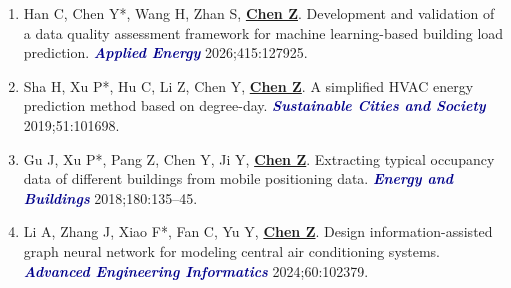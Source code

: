 \documentclass[11pt,a4paper]{article}
\newcommand{\me}[1]{\underline{\textbf{#1}}}
\newcommand{\journal}[1]{\textcolor{darkblue}{\textbf{\textit{#1}}}}
\begin{document}
\begin{enumerate}
\item Han C, Chen Y*, Wang H, Zhan S, \me{Chen Z}. Development and validation of a data quality assessment framework for machine learning-based building load prediction. \journal{Applied Energy} 2026;415:127925.

\item Sha H, Xu P*, Hu C, Li Z, Chen Y, \me{Chen Z}. A simplified HVAC energy prediction method based on degree-day. \journal{Sustainable Cities and Society} 2019;51:101698.

\item Gu J, Xu P*, Pang Z, Chen Y, Ji Y, \me{Chen Z}. Extracting typical occupancy data of different buildings from mobile positioning data. \journal{Energy and Buildings} 2018;180:135--45.

\item Li A, Zhang J, Xiao F*, Fan C, Yu Y, \me{Chen Z}. Design information-assisted graph neural network for modeling central air conditioning systems. \journal{Advanced Engineering Informatics} 2024;60:102379.
\end{enumerate}
\end{document}

